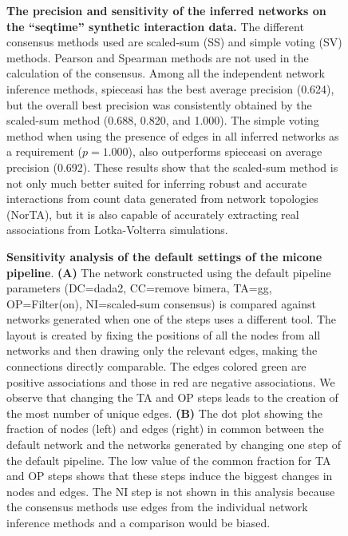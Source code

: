   \begin{figure}[H]
    \centering
      \caption{
        \textbf{The precision and sensitivity of the inferred networks on the ``seqtime'' synthetic interaction data.}
        The different consensus methods used are scaled-sum (SS) and simple voting (SV) methods.
        Pearson and Spearman methods are not used in the calculation of the consensus.
        Among all the independent network inference methods, \acs{spieceasi} has the best average precision (0.624), but the overall best precision was consistently obtained by the scaled-sum method (0.688, 0.820, and 1.000).
        The simple voting method when using the presence of edges in all inferred networks as a requirement ($p = 1.000$), also outperforms \acs{spieceasi} on average precision (0.692).
        These results show that the scaled-sum method is not only much better suited for inferring robust and accurate interactions from count data generated from network topologies (NorTA), but it is also capable of accurately extracting real associations from Lotka-Volterra simulations.
      }
    \label{fig:figure_s6}
  \end{figure}

  \begin{figure}[H]
    \centering
    \caption{
      \textbf{Sensitivity analysis of the default settings of the \ac{micone} pipeline}.
      \textbf{(A)} The network constructed using the default pipeline parameters (DC=\ac{dada2}, CC=remove bimera, TA=\ac{gg}, OP=Filter(on), NI=scaled-sum consensus) is compared against networks generated when one of the steps uses a different tool.
      The layout is created by fixing the positions of all the nodes from all networks and then drawing only the relevant edges, making the connections directly comparable.
      The edges colored green are positive associations and those in red are negative associations.
      We observe that changing the TA and OP steps leads to the creation of the most number of unique edges.
      \textbf{(B)} The dot plot showing the fraction of nodes (left) and edges (right) in common between the default network and the networks generated by changing one step of the default pipeline.
      The low value of the common fraction for TA and OP steps shows that these steps induce the biggest changes in nodes and edges.
      The NI step is not shown in this analysis because the consensus methods use edges from the individual network inference methods and a comparison would be biased.
    }
    \label{fig:figure_s7}
  \end{figure}

